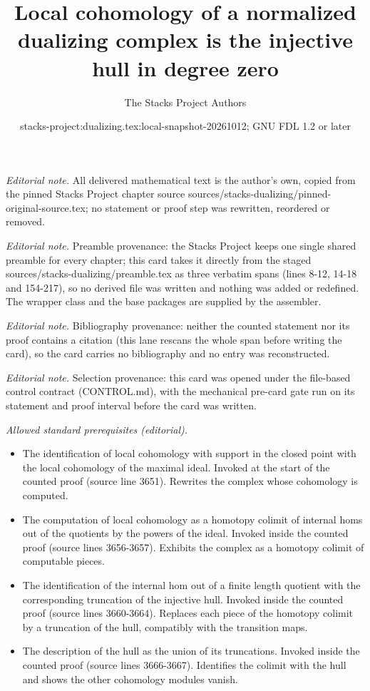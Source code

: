 \documentclass[10pt,a4paper]{amsart}
\title{Local cohomology of a normalized dualizing complex is the injective hull in degree zero}
\author{The Stacks Project Authors}
\date{stacks-project:dualizing.tex:local-snapshot-20261012; GNU FDL 1.2 or later}
\theoremstyle{plain}
\theoremstyle{definition}
\theoremstyle{remark}
\numberwithin{equation}{subsection}
\begin{document}
\maketitle
\noindent\textit{Editorial note.} All delivered mathematical text is the author's own, copied from the pinned Stacks Project chapter source sources/stacks-dualizing/pinned-original-source.tex; no statement or proof step was rewritten, reordered or removed.\par\medskip
\noindent\textit{Editorial note.} Preamble provenance: the Stacks Project keeps one single shared preamble for every chapter; this card takes it directly from the staged sources/stacks-dualizing/preamble.tex as three verbatim spans (lines 8-12, 14-18 and 154-217), so no derived file was written and nothing was added or redefined. The wrapper class and the base packages are supplied by the assembler.\par\medskip
\noindent\textit{Editorial note.} Bibliography provenance: neither the counted statement nor its proof contains a citation (this lane rescans the whole span before writing the card), so the card carries no bibliography and no entry was reconstructed.\par\medskip
\noindent\textit{Editorial note.} Selection provenance: this card was opened under the file-based control contract (CONTROL.md), with the mechanical pre-card gate run on its statement and proof interval before the card was written.\par\medskip
\noindent\textit{Allowed standard prerequisites (editorial).}\begin{itemize}
\item The identification of local cohomology with support in the closed point with the local cohomology of the maximal ideal. Invoked at the start of the counted proof (source line 3651). Rewrites the complex whose cohomology is computed.
\item The computation of local cohomology as a homotopy colimit of internal homs out of the quotients by the powers of the ideal. Invoked inside the counted proof (source lines 3656-3657). Exhibits the complex as a homotopy colimit of computable pieces.
\item The identification of the internal hom out of a finite length quotient with the corresponding truncation of the injective hull. Invoked inside the counted proof (source lines 3660-3664). Replaces each piece of the homotopy colimit by a truncation of the hull, compatibly with the transition maps.
\item The description of the hull as the union of its truncations. Invoked inside the counted proof (source lines 3666-3667). Identifies the colimit with the hull and shows the other cohomology modules vanish.
\end{itemize}\medskip
\end{document}
